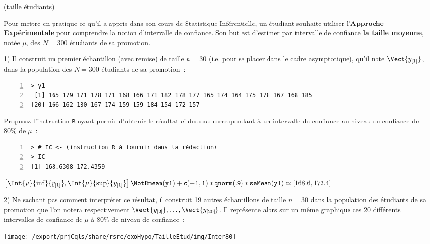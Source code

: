 \documentclass[10pt]{report}
\begin{document}
\begin{exercice} (taille étudiants)

Pour mettre en pratique ce qu'il a appris dans son cours de Statistique Inf{\'e}rentielle, un {\'e}tudiant souhaite utiliser l'\textbf{Approche Exp{\'e}rimentale} pour comprendre la notion d'intervalle de confiance. Son but est d'estimer par intervalle de confiance  \textbf{la taille moyenne}, not{\'e}e $\mu$, des $N=300$ {\'e}tudiants de sa promotion. 

1) Il construit un premier {\'e}chantillon (avec remise) de taille $n=30$ (i.e. pour se placer dans le cadre asymptotique), qu'il note $\Vect{y_{[1]}}$, dans la population des $N=300$ {\'e}tudiants de sa promotion~:

\begin{Verbatim}[frame=leftline,fontfamily=tt,fontshape=n,numbers=left]
> y1
 [1] 165 179 171 178 171 168 166 171 182 178 177 165 174 164 175 178 167 168 185
[20] 166 162 180 167 174 159 159 184 154 172 157
\end{Verbatim}


Proposez l'instruction \texttt{R} ayant permis d'obtenir le résultat ci-dessous correspondant à un intervalle de confiance au niveau de confiance de 80\% de $\mu$~:

\IndicR
\begin{Verbatim}[frame=leftline,fontfamily=tt,fontshape=n,numbers=left]
> # IC <- (instruction R à fournir dans la rédaction)
> IC
[1] 168.6308 172.4359
\end{Verbatim}



\begin{Correction}
$\left[\Int{\mu}{\inf}{y_{[1]}},\Int{\mu}{\sup}{y_{[1]}}\right]\NotR \mathtt{mean(y1) +c(-1,1)*qnorm(.9)* seMean(y1)}\simeq [168.6,172.4]$
\end{Correction}



2) Ne sachant pas comment interpr{\'e}ter ce r{\'e}sultat, il construit 19 autres {\'e}chantillons de taille $n=30$ dans la population des {\'e}tudiants de sa promotion que l'on notera respectivement $\Vect{y_{[2]}},\ldots,\Vect{y_{[20]}}$. Il repr{\'e}sente alors sur un m{\^e}me graphique ces 20 diff{\'e}rents intervalles de confiance de $\mu$ {\`a} $80\%$ de niveau de confiance~:
\begin{center}
\texttt{[image: /export/prjCqls/share/rsrc/exoHypo/TailleEtud/img/Inter80]} 
\end{center}


\end{exercice}
\end{document}
